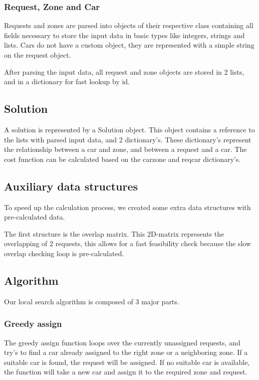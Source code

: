 \documentclass[11pt]{article}
\begin{document}
        \subsubsection{Request, Zone and Car}
            Requests and zones are parsed into objects of their respective class containing all fields necessary to store the input data in basic types like integers, strings and lists.
            Cars do not have a custom object, they are represented with a simple string on the request object.

            After parsing the input data, all request and zone objects are stored in 2 lists, and in a dictionary for fast lookup by id. 
        
        \subsection{Solution}
            A solution is represented by a Solution object. This object contains a reference to the lists with parsed input data, and 2 dictionary's.
            These dictionary's represent the relationship between a car and zone, and between a request and a car.
            The cost function can be calculated based on the car\textunderscore zone and req\textunderscore car dictionary's.

        \subsection{Auxiliary data structures}
            To speed up the calculation process, we created some extra data structures with pre-calculated data.

            The first structure is the overlap matrix. This 2D-matrix represents the overlapping of 2 requests, this allows for a fast feasibility check because
            the slow overlap checking loop is pre-calculated.


    \subsection{Algorithm}
        Our local search algorithm is composed of 3 major parts.
        \subsubsection{Greedy assign}
            The greedy assign function loops over the currently unassigned requests, and try's to find a car already assigned to the right zone or a neighboring zone.
            If a suitable car is found, the request will be assigned. If no suitable car is available, the function will take a new car and assign it to the required zone and request.
\end{document}
